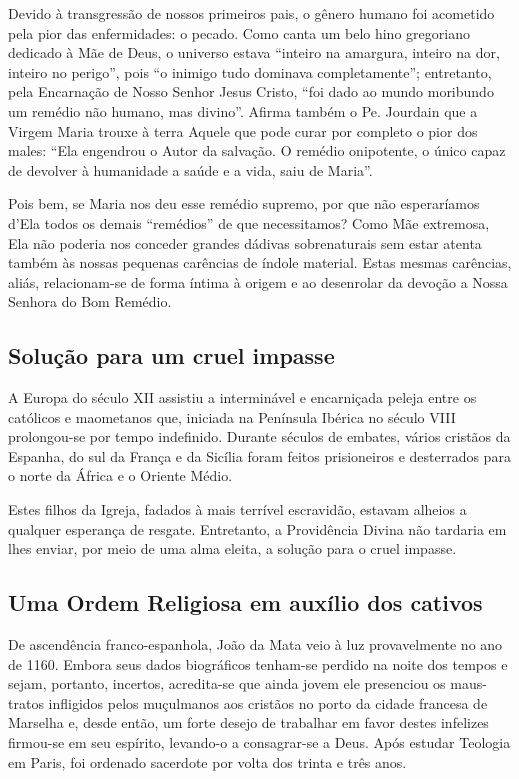 \documentclass[a4paper,14pt]{extarticle} \usepackage[utf8]{inputenc}
\begin{document}
Devido à transgressão de nossos primeiros pais, o gênero humano foi acometido pela pior das enfermidades: o pecado. Como canta um belo hino gregoriano dedicado à Mãe de Deus, o universo estava “inteiro na amargura, inteiro na dor, inteiro no perigo”, pois “o inimigo tudo dominava completamente”; entretanto, pela Encarnação de Nosso Senhor Jesus Cristo, “foi dado ao mundo moribundo um remédio não humano, mas divino”. Afirma também o Pe. Jourdain que a Virgem Maria trouxe à terra Aquele que pode curar por completo o pior dos males: “Ela engendrou o Autor da salvação. O remédio onipotente, o único capaz de devolver à humanidade a saúde e a vida, saiu de Maria”.

Pois bem, se Maria nos deu esse remédio supremo, por que não esperaríamos d’Ela todos os demais “remédios” de que necessitamos? Como Mãe extremosa, Ela não poderia nos conceder grandes dádivas sobrenaturais sem estar atenta também às nossas pequenas carências de índole material. Estas mesmas carências, aliás, relacionam-se de forma íntima à origem e ao desenrolar da devoção a Nossa Senhora do Bom Remédio.

\subsection{Solução para um cruel impasse}

A Europa do século XII assistiu a interminável e encarniçada peleja entre os católicos e maometanos que, iniciada na Península Ibérica no século VIII prolongou-se por tempo indefinido. Durante séculos de embates, vários cristãos da Espanha, do sul da França e da Sicília foram feitos prisioneiros e desterrados para o norte da África e o Oriente Médio.

Estes filhos da Igreja, fadados à mais terrível escravidão, estavam alheios a qualquer esperança de resgate. Entretanto, a Providência Divina não tardaria em lhes enviar, por meio de uma alma eleita, a solução para o cruel impasse.

\subsection{Uma Ordem Religiosa em auxílio dos cativos}

De ascendência franco-espanhola, João da Mata veio à luz provavelmente no ano de 1160. Embora seus dados biográficos tenham-se perdido na noite dos tempos e sejam, portanto, incertos, acredita-se que ainda jovem ele presenciou os maus-tratos infligidos pelos muçulmanos aos cristãos no porto da cidade francesa de Marselha e, desde então, um forte desejo de trabalhar em favor destes infelizes firmou-se em seu espírito, levando-o a consagrar-se a Deus. Após estudar Teologia em Paris, foi ordenado sacerdote por volta dos trinta e três anos.
\end{document}

